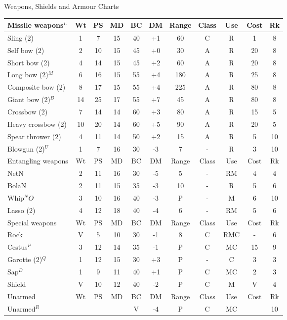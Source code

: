 \begin{Tables}{Weapons, Shields and Armour Charts}
\begin{tabularx}{\linewidth}{Xcccccccccc}
Missile weapons$^L$	& Wt	& PS	& MD	& BC	& DM	& Range	& Class	& Use	& Cost	& Rk	\\ \midrule
Sling (2)		& 1	& 7	& 15	& 40	& +1	& 60	& C	& R	& 1	& 8	\\ \hline
Self bow (2)		& 2	& 10	& 15	& 45	& +0	& 30	& A	& R	& 20	& 8	\\ \hline
Short bow (2)		& 4	& 14	& 15	& 45	& +2	& 60	& A	& R	& 20	& 8	\\ \hline
Long bow (2)$^M$	& 6	& 16	& 15	& 55	& +4	& 180	& A	& R	& 25	& 8	\\ \hline
Composite bow (2)	& 8	& 17	& 15	& 55	& +4	& 225	& A	& R	& 80	& 8	\\ \hline
Giant bow (2)$^B$	& 14	& 25	& 17	& 55	& +7	& 45	& A	& R	& 80	& 8	\\ \hline
Crossbow (2)		& 7	& 14	& 14	& 60	& +3	& 80	& A	& R	& 15	& 5	\\ \hline
Heavy crossbow (2)	& 10	& 20	& 14	& 60	& +5	& 90	& A	& R	& 20	& 5	\\ \hline
Spear thrower (2)	& 4	& 11	& 14	& 50	& +2	& 15	& A	& R	& 5	& 10	\\ \hline
Blowgun (2)$^U$		& 1	& 7	& 16	& 30	& -3	& 7	& -	& R	& 3	& 10	\\ \hline
Entangling weapons	& Wt	& PS	& MD	& BC	& DM	& Range	& Class	& Use	& Cost	& Rk	\\ \midrule
NetN			& 2	& 11	& 16	& 30	& -5	& 5	& -	& RM	& 4	& 4	\\ \hline
BolaN			& 2	& 11	& 15	& 35	& -3	& 10	& -	& R	& 5	& 6	\\ \hline
Whip$^N O$		& 3	& 10	& 16	& 40	& -3	& P	& -	& M	& 6	& 10	\\ \hline
Lasso (2)		& 4	& 12	& 18	& 40	& -4	& 6	& -	& RM	& 5	& 6	\\ \hline
Special weapons		& Wt	& PS	& MD	& BC	& DM	& Range	& Class	& Use	& Cost	& Rk	\\ \midrule
Rock			& V	& 5	& 10	& 30	& -1	& 8	& C	& RMC	& -	& 6	\\ \hline
Cestus$^P$		& 3	& 12	& 14	& 35	& -1	& P	& C	& MC	& 15	& 9	\\ \hline
Garotte (2)$^Q$		& 1	& 12	& 15	& 30	& +3	& P	& -	& C	& 3	& 3	\\ \hline
Sap$^D$			& 1	& 9	& 11	& 40	& +1	& P	& C	& MC	& 2	& 3	\\ \hline
Shield			& V	& 10	& 12	& 40	& -2	& P	& C	& M	& V	& 4	\\ \hline
Unarmed			& Wt	& PS	& MD	& BC	& DM	& Range	& Class	& Use	& Cost	& Rk	\\ \midrule
Unarmed$^R$		&	& 	& 	& V	& -4	& P	& C	& MC	& 	& 10	\\ \bottomrule
\end{tabularx}


\end{Tables}
